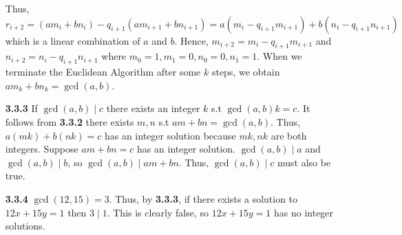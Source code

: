 \documentclass[10pt]{article}
\begin{document}
\begin{enumerate}
    Thus, $r_{i+2}=(am_i+bn_i)-q_{i+1}(am_{i+1}+bn_{i+1})=a(m_i-q_{i+1}m_{i+1})+b(n_i-q_{i+1}n_{i+1})$ which is a linear combination of $a$ and $b$.
    Hence, $m_{i+2}=m_i-q_{i+1}m_{i+1}$ and $n_{i+2}=n_i-q_{i+1}n_{i+1}$ where $m_0=1,m_1=0,n_0=0,n_1=1$. 
    When we terminate the Euclidean Algorithm after some $k$ steps, we obtain $am_k+bn_k=\gcd(a,b)$.
    \item [\textbf{3.3.3}] If $\gcd(a,b)\mid c$ there exists an integer $k$ s.t $\gcd(a,b)k=c$. 
    It follows from \textbf{3.3.2} there exists $m,n$ s.t $am+bn=\gcd(a,b)$. 
    Thus, $a(mk)+b(nk)=c$ has an integer solution because $mk,nk$ are both integers.
    Suppose $am+bn=c$ has an integer solution. 
    $\gcd(a,b)\mid a$ and $\gcd(a,b)\mid b$, so $\gcd(a,b)\mid am+bn$. 
    Thus, $\gcd(a,b)\mid c$ must also be true.
    \item [\textbf{3.3.4}] $\gcd(12,15)=3$. Thus, by \textbf{3.3.3}, if there exists a solution to $12x+15y=1$ then $3\mid 1$. This is clearly false, so $12x+15y=1$ has no integer solutions.
\end{enumerate}
\end{document}
